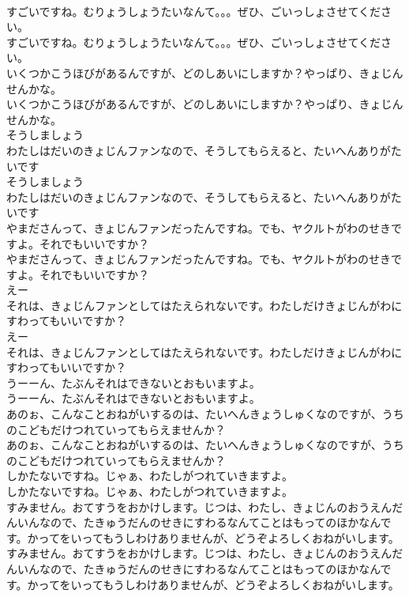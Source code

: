 \documentclass[8pt]{extreport}
\begin{document}
\begin{CJK}{UTF8}{min}
\\	すごいですね。むりょうしょうたいなんて。。。ぜひ、ごいっしょさせてください。
\\	すごいですね。むりょうしょうたいなんて。。。ぜひ、ごいっしょさせてください。
\\	いくつかこうほびがあるんですが、どのしあいにしますか？やっぱり、きょじんせんかな。
\\	いくつかこうほびがあるんですが、どのしあいにしますか？やっぱり、きょじんせんかな。
\\	そうしましょう
\\	わたしはだいのきょじんファンなので、そうしてもらえると、たいへんありがたいです
\\	そうしましょう
\\	わたしはだいのきょじんファンなので、そうしてもらえると、たいへんありがたいです
\\	やまださんって、きょじんファンだったんですね。でも、ヤクルトがわのせきですよ。それでもいいですか？
\\	やまださんって、きょじんファンだったんですね。でも、ヤクルトがわのせきですよ。それでもいいですか？
\\	えー
\\	それは、きょじんファンとしてはたえられないです。わたしだけきょじんがわにすわってもいいですか？
\\	えー
\\	それは、きょじんファンとしてはたえられないです。わたしだけきょじんがわにすわってもいいですか？
\\	うーーん、たぶんそれはできないとおもいますよ。
\\	うーーん、たぶんそれはできないとおもいますよ。
\\	あのぉ、こんなことおねがいするのは、たいへんきょうしゅくなのですが、うちのこどもだけつれていってもらえませんか？
\\	あのぉ、こんなことおねがいするのは、たいへんきょうしゅくなのですが、うちのこどもだけつれていってもらえませんか？
\\	しかたないですね。じゃぁ、わたしがつれていきますよ。
\\	しかたないですね。じゃぁ、わたしがつれていきますよ。
\\	すみません。おてすうをおかけします。じつは、わたし、きょじんのおうえんだんいんなので、たきゅうだんのせきにすわるなんてことはもってのほかなんです。かってをいってもうしわけありませんが、どうぞよろしくおねがいします。
\\	すみません。おてすうをおかけします。じつは、わたし、きょじんのおうえんだんいんなので、たきゅうだんのせきにすわるなんてことはもってのほかなんです。かってをいってもうしわけありませんが、どうぞよろしくおねがいします。

\end{CJK}
\end{document}
